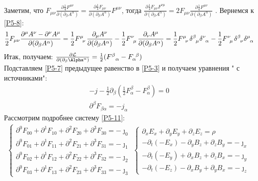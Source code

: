 \documentclass[__main__.tex]{subfiles}
\begin{document}
Заметим, что
$F_{\mu\nu}\frac{\partial\frac{1}{4}F^{\mu\nu}}{\partial(\partial_\beta A^\alpha)}=\frac{\partial\frac{1}{4}F_{\mu\nu}}{\partial(\partial_\beta A^\alpha)}F^{\mu\nu}$, тогда $\frac{\partial\frac{1}{4}F_{\mu\nu}F^{\nu\mu}}{\partial(\partial_\beta A^\alpha)}=2F_{\mu\nu}\frac{\partial\frac{1}{4}F^{\mu\nu}}{\partial(\partial_\beta A^\alpha)}$
. Вернемся к \ref{P5-8}:\\
\begin{gather}
    \label{P5-9}
    \frac{1}{2}F_{\mu\nu}\frac{\partial^\mu A^\nu-\partial^\nu A^\mu}{{\partial(\partial_\beta A^\alpha)}}=
    \frac{1}{2}F\indices{^{\mu}_\nu}\frac{\partial_\mu A^\nu}{{\partial(\partial_\beta A^\alpha)}}-\frac{1}{2}F\indices{^{\nu}_\mu}\frac{\partial_\nu A^\mu}{{\partial(\partial_\beta A^\alpha)}}=
    \frac{1}{2}\tensor{F}{^{\mu}_\nu}\tensor{\delta}{^{\beta}_\mu}\tensor{\delta}{^{\nu}_\alpha}-\frac{1}{2}\tensor{F}{^{\nu}_\mu}\tensor{\delta}{^{\beta}_\nu}\tensor{\delta}{^{\mu}_\alpha}
\end{gather}
Итак, получаем:
$\frac{\partial \mathcal{L}}{\partial(\partial_\beta\Alpha^\alpha)}=
    \frac{1}{2}(F^\beta_{\ \ \alpha}-F_\alpha^{\ \beta})$
\\
Подставляем \ref{P5-7} предыдущее равенство в \ref{P5-3} и получаем уравнения " с источниками":\\
\begin{gather}
    \label{P5-10}
    -j-\frac{1}{2}\partial_\beta(\frac{1}{2}F^\beta_\alpha-F_\alpha^\beta)=0\\
    \label{P5-11}
    \partial^\beta F_{\beta\alpha}=-j_\alpha
\end{gather}
Рассмотрим подробнее систему \ref{P5-11}:\\
\begin{gather}
    \label{P5-12}
    \begin{cases}
        \partial^0F_{00}+\partial^1F_{10}+\partial^2F_{20}+\partial^3F_{30}=-\jmath_0 \\
        \partial^0F_{01}+\partial^1F_{11}+\partial^2F_{21}+\partial^3F_{31}=-\jmath_1 \\
        \partial^0F_{02}+\partial^1F_{12}+\partial^2F_{22}+\partial^3F_{32}=-\jmath_2 \\
        \partial^0F_{03}+\partial^1F_{13}+\partial^2F_{23}+\partial^3F_{33}=-\jmath_3
    \end{cases}
    \begin{cases}
        \partial_xE_x+\partial_yE_y+\partial_zE_z=\rho          \\
        -\partial_t(-E_x)-\partial_yB_z+\partial_zB_y=-\jmath_x \\
        -\partial_t(-E_y)+\partial_xB_z+\partial_zB_x=-\jmath_y \\
        -\partial_t(-E_z)-\partial_xB_y+\partial_yB_x=-\jmath_z
    \end{cases}
\end{gather}
\end{document}
